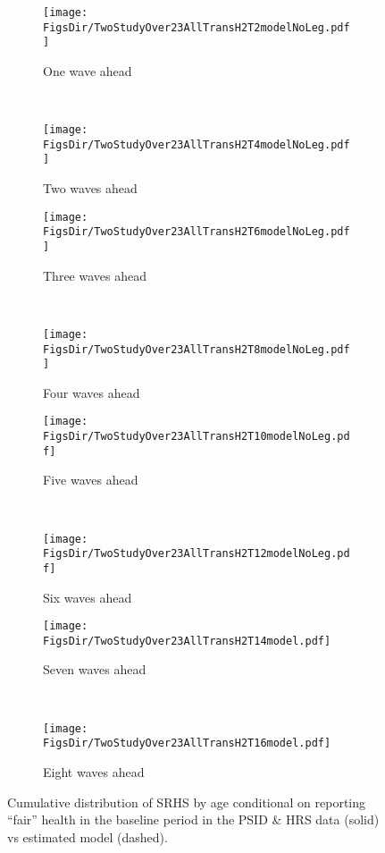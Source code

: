 \documentclass[12pt,pdftex,letterpaper]{article}
\newcommand{\RootDir}{..}
\newcommand{\FigsDir}{\RootDir/Figures}
\begin{document}
\begin{figure}
	\centering
	\begin{subfigure}[b]{0.48\textwidth}
		\texttt{[image: \\FigsDir/TwoStudyOver23AllTransH2T2modelNoLeg.pdf]}
		\caption{One wave ahead}\label{fig:Model1AheadFair}
	\end{subfigure}
	~
	\begin{subfigure}[b]{0.48\textwidth}
		\texttt{[image: \\FigsDir/TwoStudyOver23AllTransH2T4modelNoLeg.pdf]}
		\caption{Two waves ahead}\label{fig:Model2AheadFair}
	\end{subfigure}
	
	\begin{subfigure}[b]{0.48\textwidth}
		\texttt{[image: \\FigsDir/TwoStudyOver23AllTransH2T6modelNoLeg.pdf]}
		\caption{Three waves ahead}\label{fig:Model3AheadFair}
	\end{subfigure}
	~
	\begin{subfigure}[b]{0.48\textwidth}
		\texttt{[image: \\FigsDir/TwoStudyOver23AllTransH2T8modelNoLeg.pdf]}
		\caption{Four waves ahead}\label{fig:Model4AheadFair}
	\end{subfigure}
	
	\begin{subfigure}[b]{0.48\textwidth}
		\texttt{[image: \\FigsDir/TwoStudyOver23AllTransH2T10modelNoLeg.pdf]}
		\caption{Five waves ahead}\label{fig:Model5AheadFair}
	\end{subfigure}
	~
	\begin{subfigure}[b]{0.48\textwidth}
		\texttt{[image: \\FigsDir/TwoStudyOver23AllTransH2T12modelNoLeg.pdf]}
		\caption{Six waves ahead}\label{fig:Model6AheadFair}
	\end{subfigure}

	\begin{subfigure}[b]{0.48\textwidth}
		\texttt{[image: \\FigsDir/TwoStudyOver23AllTransH2T14model.pdf]}
		\caption{Seven waves ahead}\label{fig:Model7AheadFair}
	\end{subfigure}
	~
	\begin{subfigure}[b]{0.48\textwidth}
		\texttt{[image: \\FigsDir/TwoStudyOver23AllTransH2T16model.pdf]}
		\caption{Eight waves ahead}\label{fig:Model8AheadFair}
	\end{subfigure}
	\caption{Cumulative distribution of SRHS by age conditional on reporting ``fair'' health in the baseline period in the PSID \& HRS data (solid) vs estimated model (dashed).}\label{fig:ModelTransFR}
\end{figure}
\end{document}
